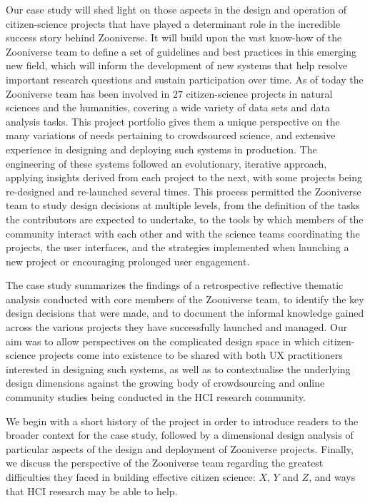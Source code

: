 Our case study will shed light on those aspects in the design and operation of citizen-science projects that have played a determinant role in the incredible success story behind Zooniverse. It will build upon the vast know-how of the Zooniverse team to define a set of guidelines and best practices in this emerging new field, which will inform the development of new systems that help resolve important research questions and sustain participation over time. As of today the Zooniverse team has been involved in $27$ citizen-science projects in natural sciences and the humanities, covering a wide variety of data sets and data analysis tasks. This project portfolio gives them a unique perspective on the many variations of needs pertaining to crowdsourced science, and extensive experience in designing and deploying such systems in production. The engineering of these systems followed an evolutionary, iterative approach, applying insights derived from each project to the next, with some projects being re-designed and re-launched several times. This process permitted the Zooniverse team to study design decisions at multiple levels, from the definition of the tasks the contributors are expected to undertake, to the tools by which members of the community interact with each other and with the science teams coordinating the projects, the user interfaces, and the strategies implemented when launching a new project or encouraging prolonged user engagement. 

The case study summarizes the findings of a retrospective reflective thematic analysis conducted with core members of the Zooniverse team, to identify the key design decisions that were made, and to document the informal knowledge gained across the various projects they have successfully launched and managed. Our aim was to allow perspectives on the complicated design space in which citizen-science projects come into existence to be shared with both UX practitioners interested in designing such systems, as well as to contextualise the underlying design dimensions against the growing body of crowdsourcing and online community studies being conducted in the HCI research community.

We begin with a short history of the project in order to introduce readers to the broader context for the case study, followed by a dimensional design analysis of particular aspects of the design and deployment of Zooniverse projects.  Finally, we discuss the perspective of the Zooniverse team regarding the greatest difficulties they faced in building effective citizen science: $X$, $Y$ and $Z$, and ways that HCI research may be able to help.


